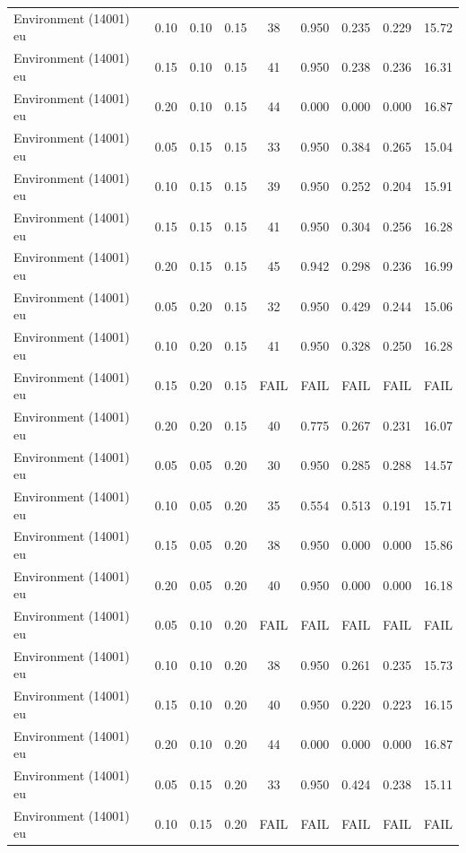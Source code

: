 \begin{longtable}[t]{lrrrccccc}
Environment (14001) eu & 0.10 & 0.10 & 0.15 & 38 & 0.950 & 0.235 & 0.229 & 15.72\\
Environment (14001) eu & 0.15 & 0.10 & 0.15 & 41 & 0.950 & 0.238 & 0.236 & 16.31\\
Environment (14001) eu & 0.20 & 0.10 & 0.15 & 44 & 0.000 & 0.000 & 0.000 & 16.87\\
Environment (14001) eu & 0.05 & 0.15 & 0.15 & 33 & 0.950 & 0.384 & 0.265 & 15.04\\
\addlinespace
Environment (14001) eu & 0.10 & 0.15 & 0.15 & 39 & 0.950 & 0.252 & 0.204 & 15.91\\
Environment (14001) eu & 0.15 & 0.15 & 0.15 & 41 & 0.950 & 0.304 & 0.256 & 16.28\\
Environment (14001) eu & 0.20 & 0.15 & 0.15 & 45 & 0.942 & 0.298 & 0.236 & 16.99\\
Environment (14001) eu & 0.05 & 0.20 & 0.15 & 32 & 0.950 & 0.429 & 0.244 & 15.06\\
Environment (14001) eu & 0.10 & 0.20 & 0.15 & 41 & 0.950 & 0.328 & 0.250 & 16.28\\
\addlinespace
Environment (14001) eu & 0.15 & 0.20 & 0.15 & FAIL & FAIL & FAIL & FAIL & FAIL\\
Environment (14001) eu & 0.20 & 0.20 & 0.15 & 40 & 0.775 & 0.267 & 0.231 & 16.07\\
Environment (14001) eu & 0.05 & 0.05 & 0.20 & 30 & 0.950 & 0.285 & 0.288 & 14.57\\
Environment (14001) eu & 0.10 & 0.05 & 0.20 & 35 & 0.554 & 0.513 & 0.191 & 15.71\\
Environment (14001) eu & 0.15 & 0.05 & 0.20 & 38 & 0.950 & 0.000 & 0.000 & 15.86\\
\addlinespace
Environment (14001) eu & 0.20 & 0.05 & 0.20 & 40 & 0.950 & 0.000 & 0.000 & 16.18\\
Environment (14001) eu & 0.05 & 0.10 & 0.20 & FAIL & FAIL & FAIL & FAIL & FAIL\\
Environment (14001) eu & 0.10 & 0.10 & 0.20 & 38 & 0.950 & 0.261 & 0.235 & 15.73\\
Environment (14001) eu & 0.15 & 0.10 & 0.20 & 40 & 0.950 & 0.220 & 0.223 & 16.15\\
Environment (14001) eu & 0.20 & 0.10 & 0.20 & 44 & 0.000 & 0.000 & 0.000 & 16.87\\
\addlinespace
Environment (14001) eu & 0.05 & 0.15 & 0.20 & 33 & 0.950 & 0.424 & 0.238 & 15.11\\
Environment (14001) eu & 0.10 & 0.15 & 0.20 & FAIL & FAIL & FAIL & FAIL & FAIL\\

\end{longtable}
